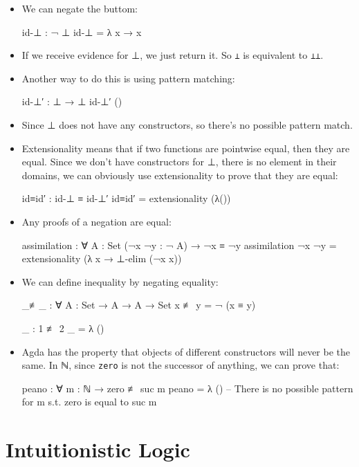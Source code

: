 \documentclass{lecturenotes}
\newcommand{\agdanats}{\textsf{ℕ}\xspace}
\newcommand{\agdaempty}{\textsf{⊥}\xspace}
\begin{document}
\begin{itemize}
\item We can negate the buttom:
\begin{code}
id-⊥ : ¬ ⊥ 
id-⊥ = λ {x → x}
\end{code}
\item If we receive evidence for \agdaempty, we just return it. 
      So \texttt{\lnot \agdaempty} is equivalent to \texttt{\agdaempty \rightarrow \agdaempty}.

\item Another way to do this is using pattern matching:
\begin{code}
id-⊥′ : ⊥ → ⊥
id-⊥′ ()
\end{code}
\item Since \agdaempty does not have any constructors, so there's no possible pattern match.

\item Extensionality means that if two functions are pointwise equal, then they are equal.
      Since we don't have constructors for \agdaempty, there is no element in their domains,
      we can obviously use extensionality to prove that they are equal:
\begin{code}
id≡id′ : id-⊥ ≡ id-⊥′
id≡id′ = extensionality (λ())
\end{code}

\item Any proofs of a negation are equal:
\begin{code}
assimilation : ∀ {A : Set} (¬x ¬y : ¬ A) → ¬x ≡ ¬y
assimilation ¬x ¬y = extensionality (λ x → ⊥-elim (¬x x))
\end{code}

\item We can define inequality by negating equality:
\begin{code}
_≢_ : ∀ {A : Set} → A → A → Set
x ≢ y = ¬ (x ≡ y)

_ : 1 ≢ 2
_ = λ ()
\end{code}
\item Agda has the property that objects of different constructors will never be the same.
      In \agdanats, since \texttt{zero} is not the successor of anything, we can prove that:

\begin{code}
peano : ∀ {m : ℕ} → zero ≢ suc m
peano = λ () -- There is no possible pattern for m s.t. zero is equal to suc m
\end{code}
\end{itemize} %

\section{Intuitionistic Logic}
\label{sec:intui-logic}
\end{document}
